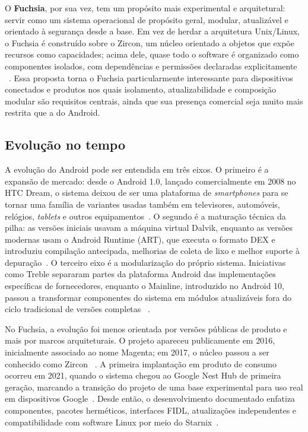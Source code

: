\documentclass[12pt,a4paper]{article}
\begin{document}
O \textbf{Fuchsia}, por sua vez, tem um propósito mais experimental e arquitetural:
servir como um sistema operacional de propósito geral, modular, atualizável e
orientado à segurança desde a base. Em vez de herdar a arquitetura Unix/Linux, o
Fuchsia é construído sobre o Zircon, um núcleo orientado a objetos que expõe
recursos como capacidades; acima dele, quase todo o software é organizado como
componentes isolados, com dependências e permissões declaradas explicitamente
~\cite{zircon,fuchsia_components,fuchsia_secure}. Essa proposta torna o Fuchsia
particularmente interessante para dispositivos conectados e produtos nos quais
isolamento, atualizabilidade e composição modular são requisitos centrais, ainda
que sua presença comercial seja muito mais restrita que a do Android.

\subsection{Evolução no tempo}

A evolução do Android pode ser entendida em três eixos. O primeiro é a expansão
de mercado: desde o Android 1.0, lançado comercialmente em 2008 no HTC Dream, o
sistema deixou de ser uma plataforma de \emph{smartphones} para se tornar uma
família de variantes usadas também em televisores, automóveis, relógios,
\emph{tablets} e outros equipamentos~\cite{androidwiki,androidsite}. O segundo é
a maturação técnica da pilha: as versões iniciais usavam a máquina virtual
Dalvik, enquanto as versões modernas usam o Android Runtime (ART), que executa o
formato DEX e introduziu compilação antecipada, melhorias de coleta de lixo e
melhor suporte à depuração~\cite{androidruntime}. O terceiro eixo é a
modularização do próprio sistema. Iniciativas como Treble separaram partes da
plataforma Android das implementações específicas de fornecedores, enquanto o
Mainline, introduzido no Android 10, passou a transformar componentes do sistema
em módulos atualizáveis fora do ciclo tradicional de versões completas
~\cite{treble,androidmainline}.

No Fuchsia, a evolução foi menos orientada por versões públicas de produto e mais
por marcos arquiteturais. O projeto apareceu publicamente em 2016, inicialmente
associado ao nome Magenta; em 2017, o núcleo passou a ser conhecido como Zircon
~\cite{fuchsiawiki,zircon}. A primeira implantação em produto de consumo ocorreu
em 2021, quando o sistema chegou ao Google Nest Hub de primeira geração, marcando
a transição do projeto de uma base experimental para uso real em dispositivos
Google~\cite{fuchsiawiki}. Desde então, o desenvolvimento documentado enfatiza
componentes, pacotes herméticos, interfaces FIDL, atualizações independentes e
compatibilidade com software Linux por meio do Starnix~\cite{fuchsia_components,
fuchsia_updatable,starnix}.
\end{document}
